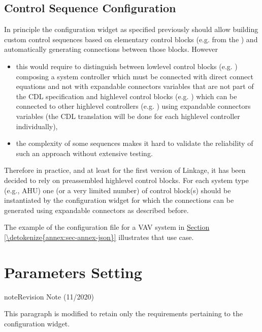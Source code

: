 \documentclass[letterpaper,10pt, openany,english]{sphinxmanual}
\begin{document}
\subsection{Control Sequence Configuration}
\label{\detokenize{requirements:control-sequence-configuration}}
In principle the configuration widget as specified previously should allow building custom control sequences based on elementary control blocks (e.g. from the ) and automatically generating connections between those blocks. However
\begin{itemize}
\item {} 
this would require to distinguish between low\sphinxhyphen{}level control blocks (e.g. ) composing a system controller \textendash{} which must be connected with direct connect equations and not with expandable connectors variables that are not part of the CDL specification \textendash{} and high\sphinxhyphen{}level control blocks (e.g. ) \textendash{} which can be connected to other high\sphinxhyphen{}level controllers (e.g. ) using expandable connectors variables (the CDL translation will be done for each high\sphinxhyphen{}level controller individually),

\item {} 
the complexity of some sequences makes it hard to validate the reliability of such an approach without extensive testing.

\end{itemize}

Therefore in practice, and at least for the first version of Linkage, it has been decided to rely on pre\sphinxhyphen{}assembled high\sphinxhyphen{}level control blocks. For each system type (e.g., AHU) one (or a very limited number) of control block(s) should be instantiated by the configuration widget for which the connections can be generated using expandable connectors as described before.

The example of the configuration file for a VAV system in \hyperref[\detokenize{annex:sec-annex-json}]{Section \ref{\detokenize{annex:sec-annex-json}}} illustrates that use case.


\section{Parameters Setting}
\label{\detokenize{requirements:parameters-setting}}\label{\detokenize{requirements:sec-parameters}}
\begin{sphinxadmonition}{note}{Revision Note (11/2020)}

This paragraph is modified to retain only the requirements pertaining to the configuration widget.
\end{sphinxadmonition}
\end{document}

